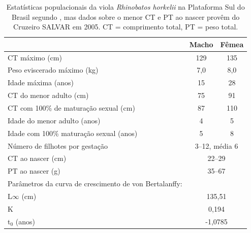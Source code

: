 \documentclass[a4paper,11pt,twoside,showtrims,onecolumn,openright,final]{memoir}
\begin{document}
\begin{table}
\caption[Estatísticas populacionais da viola \emph{Rhinobatos horkelii} 
         na Plataforma Sul do Brasil]
        {Estatísticas populacionais da viola \emph{Rhinobatos horkelii} 
         na Plataforma Sul do Brasil segundo \citet{lessa1982}, mas dados 
	 sobre o menor CT e PT ao nascer provêm do Cruzeiro SALVAR em 2005.
	 CT = comprimento total, PT = peso total.}
\label{tab:parametros-populacionais-viola}	 
\begin{center}
\begin{tabularx}{\textwidth}{Xcc}
\toprule
			& Macho		& Fêmea		\\
\midrule
\addlinespace
CT máximo (cm)		& 129		& 135		\\
\addlinespace
Peso eviscerado 
máximo (kg)		& 7,0		& 8,0		\\
\addlinespace
Idade máxima (anos)	& 15		& 28		\\
\addlinespace
CT do menor 
adulto (cm)		& 75		& 91		\\
\addlinespace
CT com 100\% de
maturação 
sexual (cm)		& 87		& 110		\\
\addlinespace
Idade do menor 
adulto (anos)		& 4		& 5		\\
\addlinespace
Idade com 100\% 
maturação 
sexual (anos)		& 5		& 8		\\
\addlinespace
Número de filhotes 
por gestação		& \multicolumn{2}{c}{3--12, média 6}	\\
\addlinespace
CT ao nascer (cm) 	& \multicolumn{2}{c}{22--29}	\\
\addlinespace
PT ao nascer (g)	& \multicolumn{2}{c}{35--67}	\\
\addlinespace
Parâmetros da curva 
de crescimento de von 
Bertalanffy: 		&	\\
\addlinespace
L$\infty$ (cm)		& \multicolumn{2}{c}{135,51}	\\
\addlinespace
K			& \multicolumn{2}{c}{0,194}	\\
\addlinespace
t$_0$ (anos)		& \multicolumn{2}{c}{-1,0785}	\\
\bottomrule
\end{tabularx}
\end{center}
\end{table}

\end{document}
